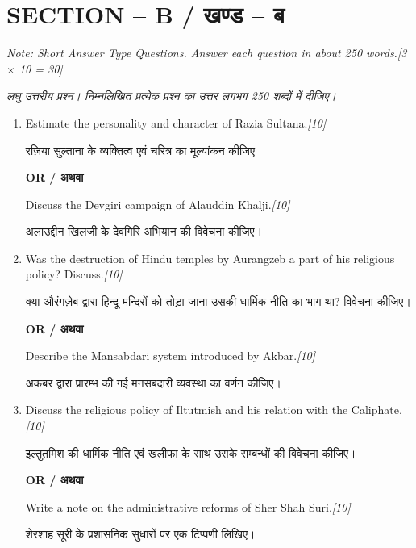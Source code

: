 \documentclass[11pt,a4paper]{article}
\newcommand{\pts}[1]{\hfill \textit{[#1]}}
\begin{document}
\bigskip

\section*{SECTION -- B / खण्ड -- ब}
\noindent \textit{Note: Short Answer Type Questions. Answer each question in about 250 words.}\pts{3 $\times$ 10 = 30}

\noindent \textit{लघु उत्तरीय प्रश्न। निम्नलिखित प्रत्येक प्रश्न का उत्तर लगभग 250 शब्दों में दीजिए।}

\begin{enumerate}[label=\textbf{\arabic*.},leftmargin=*,start=2,itemsep=12pt]

  \item Estimate the personality and character of Razia Sultana.\pts{10}
  
  रज़िया सुल्ताना के व्यक्तित्व एवं चरित्र का मूल्यांकन कीजिए।

  \begin{center}\textbf{OR / अथवा}\end{center}

  Discuss the Devgiri campaign of Alauddin Khalji.\pts{10}
  
  अलाउद्दीन खिलजी के देवगिरि अभियान की विवेचना कीजिए।

  \item Was the destruction of Hindu temples by Aurangzeb a part of his religious policy? Discuss.\pts{10}
  
  क्या औरंगज़ेब द्वारा हिन्दू मन्दिरों को तोड़ा जाना उसकी धार्मिक नीति का भाग था? विवेचना कीजिए।

  \begin{center}\textbf{OR / अथवा}\end{center}

  Describe the Mansabdari system introduced by Akbar.\pts{10}
  
  अकबर द्वारा प्रारम्भ की गई मनसबदारी व्यवस्था का वर्णन कीजिए।

  \item Discuss the religious policy of Iltutmish and his relation with the Caliphate.\pts{10}
  
  इल्तुतमिश की धार्मिक नीति एवं खलीफा के साथ उसके सम्बन्धों की विवेचना कीजिए।

  \begin{center}\textbf{OR / अथवा}\end{center}

  Write a note on the administrative reforms of Sher Shah Suri.\pts{10}
  
  शेरशाह सूरी के प्रशासनिक सुधारों पर एक टिप्पणी लिखिए।

\end{enumerate}
\end{document}
